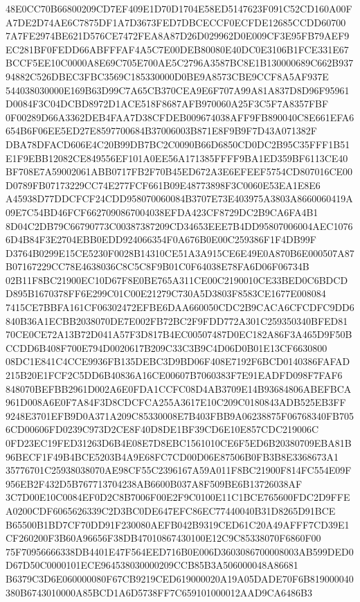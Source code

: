 \documentclass[UTF8,fontset=fandol,zihao=-4,a4paper]{ctexart}
\begin{document}
{{48E0CC70B66800209CD7EF409E1D70D1704E58ED5147623F091C52CD160A00FA7DE2D74AE6C7875DF1A7D3673FED7DBCECCF0ECFDE12685CCDD60700
7A7FE2974BE621D576CE7472FEA8A87D26D029962D0E009CF3E95FB79AEF9EC281BF0FEDD66ABFFFAF4A5C7E00DEB80080E40DC0E3106B1FCE331E67
BCCF5EE10C0000A8E69C705E700AE5C2796A3587BC8E1B130000689C662B93794882C526DBEC3FBC3569C185330000D0BE9A8573CBE9CCF8A5AF937E
544038030000E169B63D99C7A65CB370CEA9E6F707A99A81A837D8D96F95961D0084F3C04DCBD8972D1ACE518F8687AFB970060A25F3C5F7A8357FBF
0F00289D66A3362DEB4FAA7D38CFDEB009674038AFF9FB890040C8E661EFA6654B6F06EE5ED27E8597700684B37006003B871E8F9B9F7D43A071382F
DBA78DFACD606E4C20B99DB7BC2C0090B66D6850CD0DC2B95C35FFF1B51E1F9EBB12082CE849556EF101A0EE56A171385FFFF9BA1ED359BF6113CE40
BF708E7A59002061ABB0717FB2F70B45ED672A3E6EFEEF5754CD807016CE00D0789FB07173229CC74E277FCF661B09E48773898F3C0060E53EA1E8E6
A45938D77DDCFCF24CDD958070060084B3707E73E403975A3803A8660060419A09E7C54BD46FCF6627090867004038EFDA423CF8729DC2B9CA6FA4B1
8D04C2DB79C66790773C00387387209CD34653EEE7B4DD95807006004AEC10766D4B84F3E2704EBB0EDD924066354F0A676B0E00C259386F1F4DB99F
D3764B0299E15CE5230F0028B14310CE51A3A915CE6E49E0A870B6E000507A87B07167229CC78E4638036C8C5C8F9B01C0F64038E78FA6D06F06734B
02B11F8BC21900EC10D67F8E0BE765A311CE00C2190010CE33BED0C6BDCDD895B1670378FF6E299C01C00E21279C730A5D3803F8583CE1677E008084
7415CE7BBFA161CF06302472EFBE6DAA660050CDC2B9CACA6CFCDFC9DD6840B36A1ECBB2038070DE7E002FB72BC2F9FDD772A301C259350340BFED81
70CE0CE72A13B72D041A57F3D817B4EC00507487D0EC182A86F3A465D9F50BCCDD6B408F700E794D0020617B209C33C3B9C4D06D0B01E13CF6630800
08DC1E841C4CCE9936FB135DEBC3D9BD06F408E7192F6BCD0140386FAFAD215B20E1FCF2C5DD6B40836A16CE00607B7060383F7E91EADFD098F7FAF6
848070BEFBB2961D002A6E0FDA1CCFC08D4AB3709E14B93684806ABEFBCA961D008A6E0F7A84F3D8CDCFCA255A3617E10C209C0180843ADB525EB3FF
9248E3701EFB9D0A371A209C85330008E7B403FBB9A06238875F06768340FB7056CD00606FD0239C973D2CE8F40D8DE1BF39CD6E10E857CDC219006C
0FD23EC19FED31263D6B4E08E7D8EBC1561010CE6F5ED6B20380709EBA81B96BECF1F49B4BCE5203B4A9E68FC7CD00D06E87506B0FB3B8E3368673A1
35776701C25938038070AE98CF55C2396167A59A011F8BC21900F814FC554E09F956EB2F432D5B767713704238AB6600B037A8F509BE6B13726038AF
3C7D00E10C0084EF0D2C8B7006F00E2F9C0100E11C1BCE765600FDC2D9FFEA0200CDF6065626339C2D3BC0DE647EFC86EC77440040B31D8265D91BCE
B65500B1BD7CF70DD91F230080AEFB042B9319CED61C20A49AFFF7CD39E1CF260200F3B60A96656F38DB47010867430100E12C9C85338070F6860F00
75F70956666338DB4401E47F564EED716B0E006D3603086700008003AB599DED0D67D50C0000101ECE964538030000209CCB85B3A506000048A86681
B6379C3D6E060000080F67CB9219CED619000020A19A05DADE70F6B819000040380B6743010000A85BCD1A6D5738FF7C659101000012AAD9CA6486B3
}}
\end{document}
